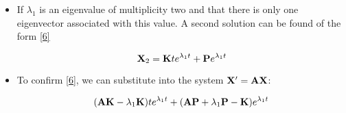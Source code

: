 \documentclass[12pt]{article}
\begin{document}
\begin{itemize}
  \item If $\lambda_1$ is an eigenvalue of multiplicity two and that there is only one eigenvector associated with this value. A second solution can be found of the form \eqref{6}

    \begin{equation}
      \bold{X}_2=\bold{K}te^{\lambda_1t}+\bold{P}e^{\lambda_1t}
      \label{6}
    \end{equation}

  \item To confirm \eqref{6}, we can substitute into the system $\bold{X}'=\bold{AX}$:

    \begin{equation}
      (\bold{AK}-\lambda_1\bold{K})te^{\lambda_1t}+(\bold{AP}+\lambda_1\bold{P}-\bold{K})e^{\lambda_1t}
      \label{7}
    \end{equation}

\end{itemize}
\end{document}
